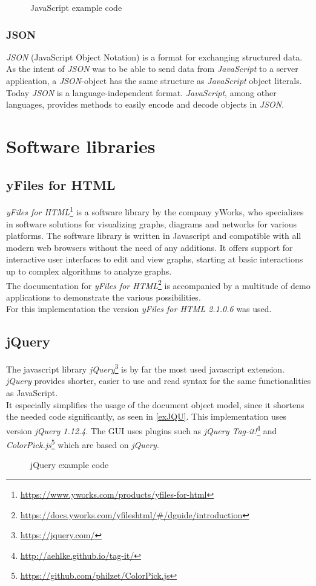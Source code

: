 \begin{figure}[!h]

\caption{JavaScript example code}
\label{exJS}
\end{figure}

\subsubsection{JSON} 
\textit{JSON} (JavaScript Object Notation) is a format for exchanging structured data. As the intent of \textit{JSON} was to be able to send data from \textit{JavaScript} to a server application, a \textit{JSON}-object has the same structure as \textit{JavaScript} object literals. Today \textit{JSON} is a language-independent format. \textit{JavaScript}, among other languages, provides methods to easily encode and decode objects in \textit{JSON}.
\section{Software libraries}
\subsection{yFiles for HTML}
\textit{yFiles for HTML}\footnote{\url{https://www.yworks.com/products/yfiles-for-html}} is a software library by the company yWorks, who specializes in software solutions for visualizing graphs, diagrams and networks for various platforms.
The software library is written in Javascript and compatible with all modern web browsers without the need of any additions. It offers support for interactive user interfaces to edit and view graphs, starting at basic interactions up to complex algorithms to analyze graphs.\\
The documentation for \textit{yFiles for HTML}\footnote{\url{https://docs.yworks.com/yfileshtml/\#/dguide/introduction}} is accompanied by a multitude of demo applications to demonstrate the various possibilities.\\
For this implementation the version \textit{yFiles for HTML 2.1.0.6} was used.
\subsection{jQuery}
The javascript library \textit{jQuery}\footnote{\url{https://jquery.com/}} is by far the most used javascript extension. \textit{jQuery} provides shorter, easier to use and read syntax for the same functionalities as JavaScript.\\
It especially simplifies the usage of the document object model, since it shortens the needed code significantly, as seen in \autoref{exJQU}.
This implementation uses version \textit{jQuery 1.12.4}. The GUI uses plugins such as \textit{jQuery Tag-it!}\footnote{\url{http://aehlke.github.io/tag-it/}} and \textit{ColorPick.js}\footnote{\url{https://github.com/philzet/ColorPick.js}} which are based on \textit{jQuery}.
\begin{figure}[!h]

\caption{jQuery example code}
\label{exJQU}
\end{figure}
